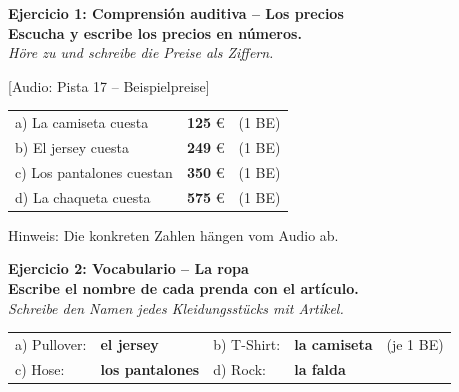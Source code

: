 \documentclass[11pt, a4paper]{article}
\newcommand{\punktebox}[1]{\hfill\fbox{\scriptsize \_\_/#1}}
\newcommand{\lsg}[1]{\textcolor{loesung}{\textbf{#1}}}
\newcommand{\aufgabe}[3]{%
    \textbf{\textcolor{spanisch}{Ejercicio #1: #2}} \punktebox{#3}\\[2pt]
}
\newcommand{\enunciado}[2]{%
    \textbf{#1}\\[1pt]
    {\small\textit{#2}}%
}
\begin{document}
\aufgabe{1}{Comprensión auditiva -- Los precios}{4}

\enunciado{Escucha y escribe los precios en números.}{Höre zu und schreibe die Preise als Ziffern.}

\vspace{4pt}
{\small\textcolor{grau}{[Audio: Pista 17 -- Beispielpreise]}}

\vspace{6pt}

\begin{tabular}{@{}p{6cm}p{4cm}p{2cm}@{}}
a) La camiseta cuesta & \lsg{125} \euro & (1 BE) \\[8pt]
b) El jersey cuesta & \lsg{249} \euro & (1 BE) \\[8pt]
c) Los pantalones cuestan & \lsg{350} \euro & (1 BE) \\[8pt]
d) La chaqueta cuesta & \lsg{575} \euro & (1 BE) \\
\end{tabular}

\vspace{4pt}
{\footnotesize\textcolor{grau}{Hinweis: Die konkreten Zahlen hängen vom Audio ab.}}

\vspace{10pt}


\aufgabe{2}{Vocabulario -- La ropa}{4}

\enunciado{Escribe el nombre de cada prenda con el artículo.}{Schreibe den Namen jedes Kleidungsstücks mit Artikel.}

\vspace{6pt}

\begin{tabular}{@{}p{2.5cm}p{4cm}p{2.5cm}p{4cm}p{2cm}@{}}
a) Pullover: & \lsg{el jersey} & b) T-Shirt: & \lsg{la camiseta} & (je 1 BE) \\[8pt]
c) Hose: & \lsg{los pantalones} & d) Rock: & \lsg{la falda} & \\
\end{tabular}

\vspace{10pt}

\end{document}
